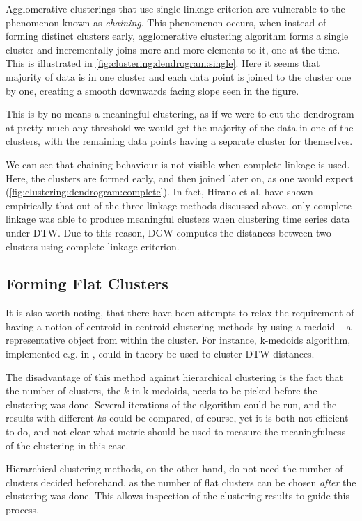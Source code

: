 \documentclass[parskip]{cs4rep}
\begin{document}
Agglomerative clusterings that use single linkage criterion are vulnerable to the phenomenon known as \emph{chaining}. This phenomenon occurs, when instead of forming distinct clusters early, agglomerative clustering algorithm forms a single cluster and incrementally joins more and more elements to it, one at the time. This is illustrated in \autoref{fig:clustering:dendrogram:single}. 
Here it seems that majority of data is in one cluster and each data point is joined to the cluster one by one, creating a smooth downwards facing slope seen in the figure. 

This is by no means a meaningful clustering, as 
if we were to cut the dendrogram at pretty much any threshold we would get the majority of the data in one of the clusters, with the remaining data points having a separate cluster for themselves. 

We can see that chaining behaviour is not visible when complete linkage is used. Here, the clusters are formed early, and then joined later on, as one would expect (\autoref{fig:clustering:dendrogram:complete}). In fact, Hirano et al. \cite{Hirano:2005wh} have shown empirically that out of the three linkage methods discussed above, only complete linkage was able to produce meaningful clusters when clustering time series data under DTW. Due to this reason, DGW computes the distances between two clusters using complete linkage criterion.

\subsection{Forming Flat Clusters}

It is also worth noting, that there have been attempts to relax the requirement of having a notion of centroid in centroid clustering methods by using a medoid -- a representative object from within the cluster. For instance, k-medoids algorithm, implemented e.g. in \cite{Park:2009ks}, could in theory be used to cluster DTW distances. 

The disadvantage of this method against hierarchical clustering is the fact that the number of clusters, the $k$ in k-medoids, needs to be picked before the clustering was done. Several iterations of the algorithm could be run, and the results with different $k$s could be compared, of course, yet it is both not efficient to do, and not clear what metric should be used to
measure the meaningfulness of the clustering in this case.

Hierarchical clustering methods, on the other hand, do not need the number of clusters decided beforehand, as the number of flat clusters can be chosen \emph{after} the clustering was done. This
allows inspection of the clustering results to guide this process.
\end{document}
